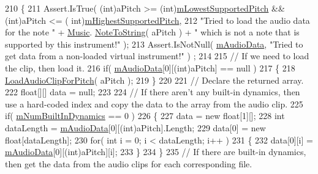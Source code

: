 \begin{DoxyCode}
210     \{
211         Assert.IsTrue( (\textcolor{keywordtype}{int})aPitch >= (\textcolor{keywordtype}{int})\hyperlink{group___v_i_base_pro_var_ga3cae52b1bcc0178a8a6b03c7aaf7aac8}{mLowestSupportedPitch} && (\textcolor{keywordtype}{int})aPitch <= (\textcolor{keywordtype}{
      int})\hyperlink{group___v_i_base_pro_var_ga61fb2c33b53a0f663047779d7ceb18f3}{mHighestSupportedPitch},
212             \textcolor{stringliteral}{"Tried to load the audio data for the note "} + \hyperlink{class_music}{Music}.
      \hyperlink{group___music_stat_func_ga85a22c905d56d4c5f4e62159bfecee8c}{NoteToString}( aPitch ) + \textcolor{stringliteral}{" which is not a note that is supported by this instrument!"} );
213         Assert.IsNotNull( \hyperlink{group___v_i_base_pro_var_ga52e76d9b74408660584676035a92a2c6}{mAudioData}, \textcolor{stringliteral}{"Tried to get data from a non-loaded virtual instrument!"} )
      ;
214 
215         \textcolor{comment}{// If we need to load the clip, then load it.}
216         \textcolor{keywordflow}{if}( \hyperlink{group___v_i_base_pro_var_ga52e76d9b74408660584676035a92a2c6}{mAudioData}[0][(\textcolor{keywordtype}{int})aPitch] == null )
217         \{
218             \hyperlink{group___v_i_base_pro_func_gadbd95083895b09465fbc5b18115a1dbc}{LoadAudioClipForPitch}( aPitch );
219         \}
220 
221         \textcolor{comment}{// Declare the returned array.}
222         \textcolor{keywordtype}{float}[][] data = null;
223 
224         \textcolor{comment}{// If there aren't any built-in dynamics, then use a hard-coded index and copy the data to the
       array from the audio clip.}
225         \textcolor{keywordflow}{if}( \hyperlink{group___v_i_base_pro_var_gac265f64f759d267ee1e1680f8d387011}{mNumBuiltInDynamics} == 0 )
226         \{
227             data = \textcolor{keyword}{new} \textcolor{keywordtype}{float}[1][];
228             \textcolor{keywordtype}{int} dataLength = \hyperlink{group___v_i_base_pro_var_ga52e76d9b74408660584676035a92a2c6}{mAudioData}[0][(int)aPitch].Length;
229             data[0] = \textcolor{keyword}{new} \textcolor{keywordtype}{float}[dataLength];
230             \textcolor{keywordflow}{for}( \textcolor{keywordtype}{int} i = 0; i < dataLength; i++ )
231             \{
232                 data[0][i] = \hyperlink{group___v_i_base_pro_var_ga52e76d9b74408660584676035a92a2c6}{mAudioData}[0][(int)aPitch][i];
233             \}
234         \}
235         \textcolor{comment}{// If there are built-in dynamics, then get the data from the audio clips for each corresponding
       file.}

\end{DoxyCode}
